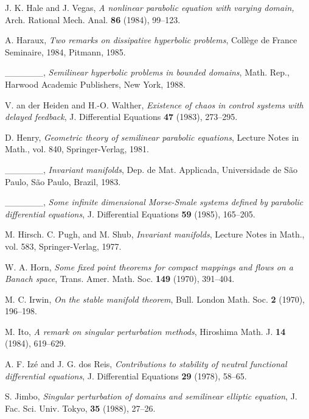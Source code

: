 \documentclass{surv-l}
\theoremstyle{plain}
\theoremstyle{definition}
\numberwithin{equation}{section}
\numberwithin{figure}{chapter}
\begin{document}
\begin{thebibliography}{}
J. K. Hale and J. Vegas, \emph{A nonlinear parabolic equation with varying domain,}
Arch. Rational Mech. Anal. \textbf{86} (1984), 99--123.

A. Haraux, \emph{Two remarks on dissipative hyperbolic problems}, Coll\`{e}ge de France Seminaire, 1984, Pitmann, 1985.

 \_\_\_\_\_\_, \emph{Semilinear hyperbolic problems in bounded domains}, Math. Rep., Harwood Academic Publishers, New York, 1988.

V. an der Heiden and H.-O. Walther, \emph{Existence of chaos in control systems with delayed feedback}, J. Differential Equations \textbf{47} (1983), 273--295.

D. Henry, \emph{Geometric theory of semilinear parabolic equations}, Lecture Notes in Math., vol. 840, Springer-Verlag, 1981.

 \_\_\_\_\_\_, \emph{Invariant manifolds}, Dep. de Mat. Applicada, Universidade de S\~{a}o Paulo, S\~{a}o Paulo, Brazil, 1983.

 \_\_\_\_\_\_, \emph{Some infinite dimensional Morse-Smale systems defined by parabolic differential equations}, J. Differential Equations \textbf{59} (1985), 165--205.

M. Hirsch. C. Pugh, and M. Shub, \emph{Invariant manifolds}, Lecture Notes in Math., vol. 583,
Springer-Verlag, 1977.

W. A. Horn, \emph{Some fixed point theorems for compact mappings and flows on a Banach space}, Trans. Amer. Math. Soc. \textbf{149} (1970), 391--404.

M. C. Irwin, \emph{On the stable manifold theorem}, Bull. London Math. Soc. \textbf{2}
(1970), 196--198.

M. Ito, \emph{A remark on singular perturbation methods}, Hiroshima Math. J. \textbf{14}
(1984), 619--629.

A. F. Iz\'{e} and J. G. dos Reis, \emph{Contributions to stability of neutral functional differential equations}, J. Differential Equations \textbf{29} (1978), 58--65.

S. Jimbo, \emph{Singular perturbation of domains and semilinear elliptic equation},
J. Fac. Sci. Univ. Tokyo, \textbf{35} (1988), 27--26.


\end{thebibliography}
\end{document}

